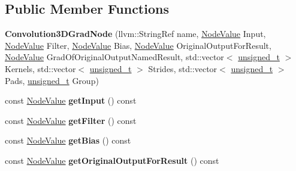 \subsection*{Public Member Functions}
\begin{DoxyCompactItemize}
\item 
\mbox{\label{classglow_1_1_convolution3_d_grad_node_a6ef2637596d3d2d275631eb831b0553b}} 
{\bfseries Convolution3\+D\+Grad\+Node} (llvm\+::\+String\+Ref name, \hyperlink{structglow_1_1_node_value}{Node\+Value} Input, \hyperlink{structglow_1_1_node_value}{Node\+Value} Filter, \hyperlink{structglow_1_1_node_value}{Node\+Value} Bias, \hyperlink{structglow_1_1_node_value}{Node\+Value} Original\+Output\+For\+Result, \hyperlink{structglow_1_1_node_value}{Node\+Value} Grad\+Of\+Original\+Output\+Named\+Result, std\+::vector$<$ \hyperlink{namespaceglow_a0ca574644e1e42ef193a9947fb4d8911}{unsigned\+\_\+t} $>$ Kernels, std\+::vector$<$ \hyperlink{namespaceglow_a0ca574644e1e42ef193a9947fb4d8911}{unsigned\+\_\+t} $>$ Strides, std\+::vector$<$ \hyperlink{namespaceglow_a0ca574644e1e42ef193a9947fb4d8911}{unsigned\+\_\+t} $>$ Pads, \hyperlink{namespaceglow_a0ca574644e1e42ef193a9947fb4d8911}{unsigned\+\_\+t} Group)
\item 
\mbox{\label{classglow_1_1_convolution3_d_grad_node_a8295665d88257ee38a896a054d69b92f}} 
const \hyperlink{structglow_1_1_node_value}{Node\+Value} {\bfseries get\+Input} () const
\item 
\mbox{\label{classglow_1_1_convolution3_d_grad_node_a5d2f5e72e7f86fcfacfa0f491d544224}} 
const \hyperlink{structglow_1_1_node_value}{Node\+Value} {\bfseries get\+Filter} () const
\item 
\mbox{\label{classglow_1_1_convolution3_d_grad_node_ae7ec7cb614a6b4d0ebe0b3771f18eb97}} 
const \hyperlink{structglow_1_1_node_value}{Node\+Value} {\bfseries get\+Bias} () const
\item 
\mbox{\label{classglow_1_1_convolution3_d_grad_node_a6575684cd0cc4db27f709c442f3632d1}} 
const \hyperlink{structglow_1_1_node_value}{Node\+Value} {\bfseries get\+Original\+Output\+For\+Result} () const
\item 

\end{DoxyCompactItemize}
